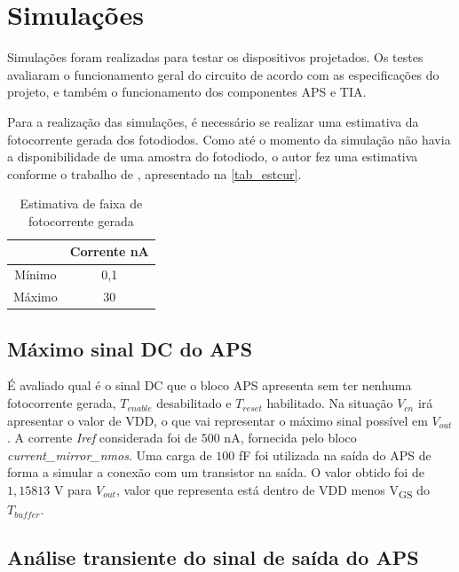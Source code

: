 \section{Simulações}

Simulações foram realizadas para testar os dispositivos projetados. Os testes avaliaram o funcionamento geral do circuito de acordo com as especificações do projeto, e também o funcionamento dos componentes APS e TIA.

Para a realização das simulações, é necessário se realizar uma estimativa da fotocorrente gerada dos fotodiodos. Como até o momento da simulação não havia a disponibilidade de uma amostra do fotodiodo, o autor fez uma estimativa conforme o trabalho de \cite{LidianeCampos}, apresentado na \autoref{tab_estcur}.

\begin{table}[!h]
\caption{Estimativa de faixa de fotocorrente gerada}
\label{tab_estcur}
\centering
\begin{tabular}{cc}
\toprule
& Corrente nA \\
\midrule \midrule
Mínimo & 0,1\\
\midrule
Máximo & 30\\
\bottomrule
\end{tabular}
\end{table}

\subsection{Máximo sinal DC do APS}
\label{DCAPS}

É avaliado qual é o sinal DC que o bloco APS apresenta sem ter nenhuma fotocorrente gerada, $T_{enable}$ desabilitado e $T_{reset}$ habilitado. Na situação $V_{cn}$ irá apresentar o valor de VDD, o que vai representar o máximo sinal possível em $V_{out}$. A corrente \textit{Iref} considerada foi de $500$ nA, fornecida pelo bloco \textit{current\_mirror\_nmos}. Uma carga de $100$ fF foi utilizada na saída do APS de forma a simular a conexão com  um transistor na saída. O valor obtido foi de $1,15813$ V para $V_{out}$, valor que representa está dentro de VDD menos V\textsubscript{GS} do $T_{buffer}$.

\subsection{Análise transiente do sinal de saída do APS}

